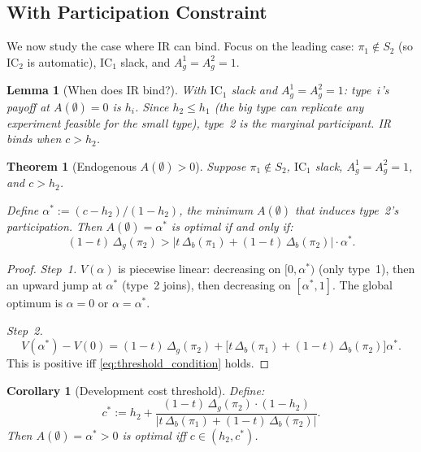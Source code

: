 \documentclass[12pt,a4paper]{article}
\newtheorem{lemma}{Lemma}
\newtheorem{theorem}{Theorem}
\newtheorem{corollary}{Corollary}
\begin{document}
\subsection{With Participation Constraint}
\label{sec:with_IR}

We now study the case where IR can bind. Focus on the
leading case: $\pi_1 \notin S_2$ (so $\mathrm{IC}_2$ is
automatic), $\mathrm{IC}_1$ slack, and $A_g^1 = A_g^2 = 1$.

\begin{lemma}[When does IR bind?]\label{lem:IR_binding}
With $\mathrm{IC}_1$ slack and $A_g^1 = A_g^2 = 1$:
type~$i$'s payoff at $A(\emptyset) = 0$ is $h_i$. Since
$h_2 \leq h_1$ (the big type can replicate any experiment
feasible for the small type), type~2 is the marginal
participant. IR binds when $c > h_2$.
\end{lemma}

\begin{theorem}[Endogenous $A(\emptyset) > 0$]
\label{thm:with_IR}
Suppose $\pi_1 \notin S_2$, $\mathrm{IC}_1$ slack,
$A_g^1 = A_g^2 = 1$, and $c > h_2$.

Define $\alpha^* := (c - h_2)/(1 - h_2)$, the minimum
$A(\emptyset)$ that induces type~2's participation. Then
$A(\emptyset) = \alpha^*$ is optimal if and only if:
\begin{equation}\label{eq:threshold_condition}
  (1-t) \, \Delta_g(\pi_2)
  > \bigl|t \, \Delta_b(\pi_1)
    + (1-t) \, \Delta_b(\pi_2)\bigr|
    \cdot \alpha^*.
\end{equation}
\end{theorem}

\begin{proof}
\emph{Step~1.}
$V(\alpha)$ is piecewise linear: decreasing on
$[0, \alpha^*)$ (only type~1), then an upward jump at
$\alpha^*$ (type~2 joins), then decreasing on
$[\alpha^*, 1]$. The global optimum is $\alpha = 0$ or
$\alpha = \alpha^*$.

\medskip
\emph{Step~2.}
\begin{equation}\label{eq:net_gain}
  V(\alpha^*) - V(0)
  = (1-t) \, \Delta_g(\pi_2)
    + \bigl[t \, \Delta_b(\pi_1)
      + (1-t) \, \Delta_b(\pi_2)\bigr] \alpha^*.
\end{equation}
This is positive iff \eqref{eq:threshold_condition} holds.
\end{proof}

\begin{corollary}[Development cost threshold]
\label{cor:threshold}
Define:
\begin{equation}\label{eq:cstar}
  c^* := h_2
  + \frac{(1-t) \, \Delta_g(\pi_2) \cdot (1 - h_2)}
         {\bigl|t \, \Delta_b(\pi_1)
           + (1-t) \, \Delta_b(\pi_2)\bigr|}.
\end{equation}
Then $A(\emptyset) = \alpha^* > 0$ is optimal iff
$c \in (h_2, c^*)$.
\end{corollary}
\end{document}
